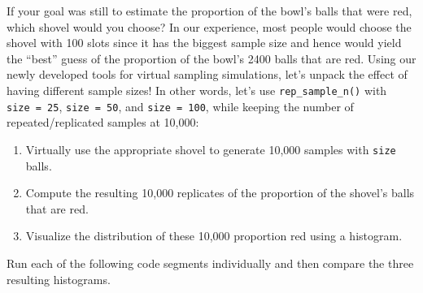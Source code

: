 \documentclass[
  letterpaper,
  DIV=11,
  numbers=noendperiod]{scrreprt}
\providecommand{\tightlist}{%
  \setlength{\itemsep}{0pt}\setlength{\parskip}{0pt}}\usepackage{longtable,booktabs,array}
\theoremstyle{definition}
\theoremstyle{remark}
\begin{document}
If your goal was still to estimate the proportion of the bowl's balls
that were red, which shovel would you choose? In our experience, most
people would choose the shovel with 100 slots since it has the biggest
sample size and hence would yield the ``best'' guess of the proportion
of the bowl's 2400 balls that are red. Using our newly developed tools
for virtual sampling simulations, let's unpack the effect of having
different sample sizes! In other words, let's use
\texttt{rep\_sample\_n()} with \texttt{size\ =\ 25},
\texttt{size\ =\ 50}, and \texttt{size\ =\ 100}, while keeping the
number of repeated/replicated samples at 10,000:

\begin{enumerate}
\def\labelenumi{\arabic{enumi}.}
\tightlist
\item
  Virtually use the appropriate shovel to generate 10,000 samples with
  \texttt{size} balls.
\item
  Compute the resulting 10,000 replicates of the proportion of the
  shovel's balls that are red.
\item
  Visualize the distribution of these 10,000 proportion red using a
  histogram.
\end{enumerate}

Run each of the following code segments individually and then compare
the three resulting histograms.
\end{document}
